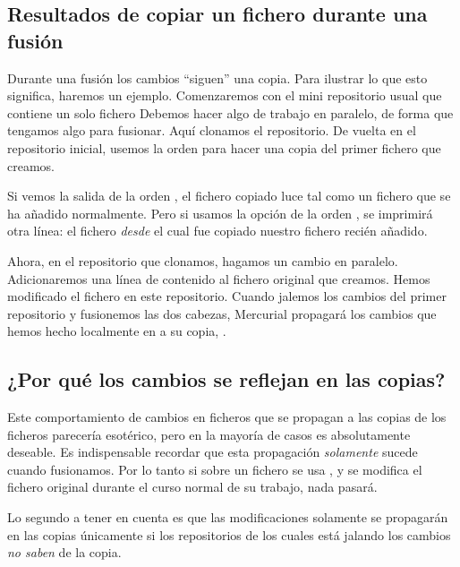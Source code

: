 \subsection{Resultados de copiar un fichero durante una fusión}

Durante una fusión los cambios ``siguen'' una copia.  Para ilustrar
lo que esto significa, haremos un ejemplo.  Comenzaremos con el mini
repositorio usual que contiene un solo fichero
Debemos hacer algo de trabajo en paralelo, de forma que tengamos algo para
fusionar. Aquí clonamos el repositorio.
De vuelta en el repositorio inicial, usemos la orden  para hacer
una copia del primer fichero que creamos.

Si vemos la salida de la orden , el fichero copiado luce
tal como un fichero que se ha añadido normalmente.
Pero si usamos la opción  de la orden
, se imprimirá otra línea: el fichero \emph{desde} el
cual fue copiado nuestro fichero recién añadido.

Ahora, en el repositorio que clonamos, hagamos un cambio en
paralelo. Adicionaremos una línea de contenido al fichero original que
creamos.
Hemos modificado el fichero  en este
repositorio. Cuando jalemos los cambios del primer repositorio y
fusionemos las dos cabezas, Mercurial propagará los cambios que hemos
hecho localmente en  a su copia, .

\subsection{¿Por qué los cambios se reflejan en las copias?}
\label{sec:daily:why-copy}

Este comportamiento de cambios en ficheros que se propagan a las
copias de los ficheros parecería esotérico, pero en la mayoría de
casos es absolutamente deseable.
Es indispensable recordar que esta propagación \emph{solamente} sucede
cuando fusionamos.  Por lo tanto si sobre un fichero se usa
, y se modifica el fichero original durante el curso
normal de su trabajo, nada pasará.

Lo segundo a tener en cuenta es que las modificaciones solamente se
propagarán en las copias únicamente si los repositorios de los cuales
está jalando los cambios \emph{no saben} de la copia.

